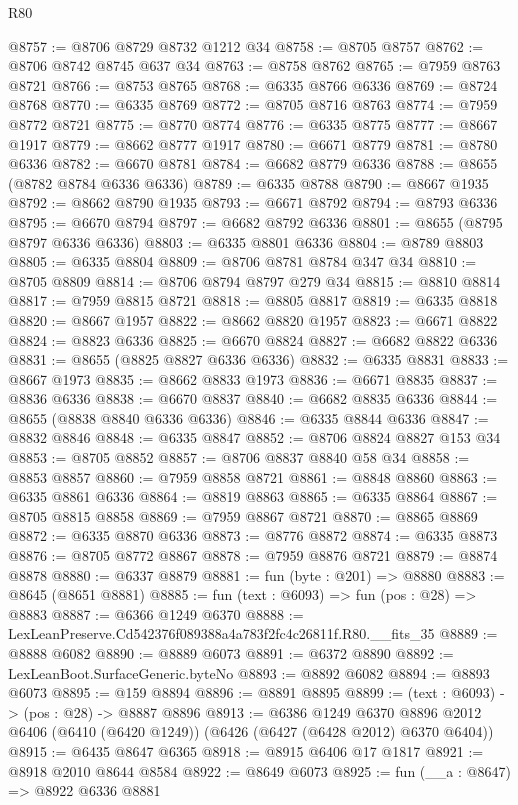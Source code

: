 \begin{lexlean}{R80}
\begin{coremodule}
@8757 := @8706 @8729 @8732 @1212 @34
@8758 := @8705 @8757
@8762 := @8706 @8742 @8745 @637 @34
@8763 := @8758 @8762
@8765 := @7959 @8763 @8721
@8766 := @8753 @8765
@8768 := @6335 @8766 @6336
@8769 := @8724 @8768
@8770 := @6335 @8769
@8772 := @8705 @8716 @8763
@8774 := @7959 @8772 @8721
@8775 := @8770 @8774
@8776 := @6335 @8775
@8777 := @8667 @1917
@8779 := @8662 @8777 @1917
@8780 := @6671 @8779
@8781 := @8780 @6336
@8782 := @6670 @8781
@8784 := @6682 @8779 @6336
@8788 := @8655 (@8782 @8784 @6336 @6336)
@8789 := @6335 @8788
@8790 := @8667 @1935
@8792 := @8662 @8790 @1935
@8793 := @6671 @8792
@8794 := @8793 @6336
@8795 := @6670 @8794
@8797 := @6682 @8792 @6336
@8801 := @8655 (@8795 @8797 @6336 @6336)
@8803 := @6335 @8801 @6336
@8804 := @8789 @8803
@8805 := @6335 @8804
@8809 := @8706 @8781 @8784 @347 @34
@8810 := @8705 @8809
@8814 := @8706 @8794 @8797 @279 @34
@8815 := @8810 @8814
@8817 := @7959 @8815 @8721
@8818 := @8805 @8817
@8819 := @6335 @8818
@8820 := @8667 @1957
@8822 := @8662 @8820 @1957
@8823 := @6671 @8822
@8824 := @8823 @6336
@8825 := @6670 @8824
@8827 := @6682 @8822 @6336
@8831 := @8655 (@8825 @8827 @6336 @6336)
@8832 := @6335 @8831
@8833 := @8667 @1973
@8835 := @8662 @8833 @1973
@8836 := @6671 @8835
@8837 := @8836 @6336
@8838 := @6670 @8837
@8840 := @6682 @8835 @6336
@8844 := @8655 (@8838 @8840 @6336 @6336)
@8846 := @6335 @8844 @6336
@8847 := @8832 @8846
@8848 := @6335 @8847
@8852 := @8706 @8824 @8827 @153 @34
@8853 := @8705 @8852
@8857 := @8706 @8837 @8840 @58 @34
@8858 := @8853 @8857
@8860 := @7959 @8858 @8721
@8861 := @8848 @8860
@8863 := @6335 @8861 @6336
@8864 := @8819 @8863
@8865 := @6335 @8864
@8867 := @8705 @8815 @8858
@8869 := @7959 @8867 @8721
@8870 := @8865 @8869
@8872 := @6335 @8870 @6336
@8873 := @8776 @8872
@8874 := @6335 @8873
@8876 := @8705 @8772 @8867
@8878 := @7959 @8876 @8721
@8879 := @8874 @8878
@8880 := @6337 @8879
@8881 := fun (byte : @201) => @8880
@8883 := @8645 (@8651 @8881)
@8885 := fun (text : @6093) => fun (pos : @28) => @8883
@8887 := @6366 @1249 @6370
@8888 := LexLeanPreserve.Cd542376f089388a4a783f2fc4c26811f.R80.__fits_35
@8889 := @8888 @6082
@8890 := @8889 @6073
@8891 := @6372 @8890
@8892 := LexLeanBoot.SurfaceGeneric.byteNo
@8893 := @8892 @6082
@8894 := @8893 @6073
@8895 := @159 @8894
@8896 := @8891 @8895
@8899 := (text : @6093) -> (pos : @28) -> @8887 @8896
@8913 := @6386
    @1249
    @6370
    @8896
    @2012
    @6406
    (@6410 (@6420 @1249))
    (@6426 (@6427 (@6428 @2012) @6370 @6404))
@8915 := @6435 @8647 @6365
@8918 := @8915 @6406 @17 @1817
@8921 := @8918 @2010 @8644 @8584
@8922 := @8649 @6073
@8925 := fun (__a : @8647) => @8922 @6336 @8881

\end{coremodule}
\end{lexlean}
